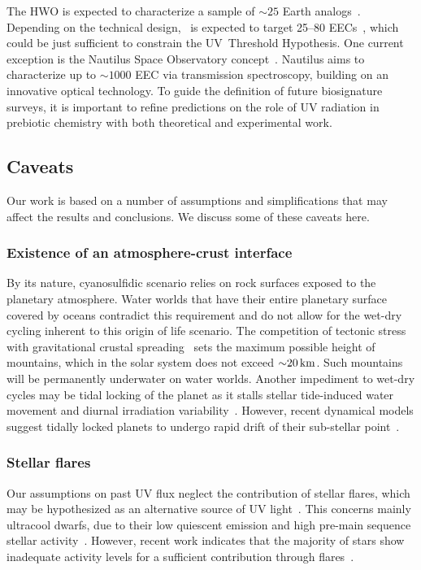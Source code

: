 \documentclass[twocolumn,twocolappendix,linenumbers]{aastex631}
\begin{document}
The \gls{HWO} is expected to characterize a sample of $\sim 25$ Earth analogs~\citep{Mamajek2023,Tuchow2024}.
Depending on the technical design, \life\ is expected to target 25–80 \glspl{EEC}~\citep{Kammerer2018,Quanz2022}, which could be just sufficient to constrain the UV~Threshold Hypothesis.
One current exception is the Nautilus Space Observatory concept~\citep{Apai2019,Apai2022}.
Nautilus aims to characterize up to $\sim 1000$ \gls{EEC} via transmission spectroscopy, building on an innovative optical technology.
To guide the definition of future biosignature surveys, it is important to refine predictions on the role of UV radiation in prebiotic chemistry with both theoretical and experimental work.



\subsection{Caveats}
Our work is based on a number of assumptions and simplifications that may affect the results and conclusions.
We discuss some of these caveats here.

\subsubsection{Existence of an atmosphere-crust interface}
By its nature, cyanosulfidic scenario relies on rock surfaces exposed to the planetary atmosphere.
Water worlds that have their entire planetary surface covered by oceans contradict this requirement and do not allow for the wet-dry cycling inherent to this origin of life scenario.
The competition of tectonic stress with gravitational crustal spreading~\citep{Melosh2011} sets the maximum possible height of mountains, which in the solar system does not exceed $\SI{\sim 20}{\kilo\meter}$.
Such mountains will be permanently underwater on water worlds.
Another impediment to wet-dry cycles may be tidal locking of the planet as it stalls stellar tide-induced water movement and diurnal irradiation variability~\citep[e.g.,][]{Ranjan2017b}.
However, recent dynamical models suggest tidally locked planets to undergo rapid drift of their sub-stellar point~\citep{Revol2024}.


\subsubsection{Stellar flares}
Our assumptions on past UV flux neglect the contribution of stellar flares, which may be hypothesized as an alternative source of UV light~\citep{Buccino2007,Ranjan2017c}.
This concerns mainly ultracool dwarfs, due to their low quiescent emission and high pre-main sequence stellar activity~\citep{Buccino2007,West2008}.
However, recent work indicates that the majority of stars show inadequate activity levels for a sufficient contribution through flares~\citep{Glazier2020,Ducrot2020,Guenther2020}.
\end{document}
